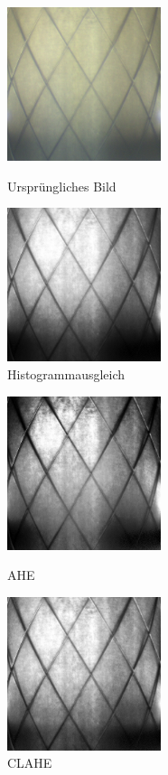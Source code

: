 \begin{figure}[ht]
\centering
\begin{minipage}[b]{0.45\linewidth}
    \centering
    \includegraphics[width=4.5cm]{98_images/30grad_cropped.png}
    \caption{Ursprüngliches Bild}
    \label{fig:30grad-cropped-img}
\end{minipage}
\quad
\begin{minipage}[b]{0.45\linewidth}
    \centering
    \includegraphics[width=4.5cm]{98_images/30grad_hist_eq.png}
    \caption{Histogrammausgleich}
    \label{fig:30grad-hist-eq-img}
\end{minipage}
\end{figure}

\begin{figure}[ht]
\centering
\begin{minipage}[b]{0.45\linewidth}
    \centering
    \includegraphics[width=4.5cm]{98_images/30grad_ahe.png}
    \caption{AHE}
    \label{fig:30grad-ahe-img}
\end{minipage}
\quad
\begin{minipage}[b]{0.45\linewidth}
    \centering
    \includegraphics[width=4.5cm]{98_images/30grad_clahe.png}
    \caption{CLAHE}
    \label{fig:30grad-clahe-img}
\end{minipage}
\end{figure}


